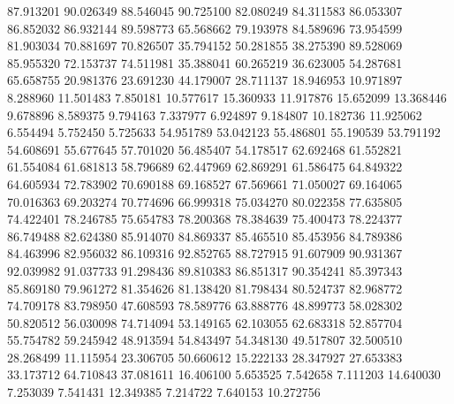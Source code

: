 87.913201
90.026349
88.546045
90.725100
82.080249
84.311583
86.053307
86.852032
86.932144
89.598773
65.568662
79.193978
84.589696
73.954599
81.903034
70.881697
70.826507
35.794152
50.281855
38.275390
89.528069
85.955320
72.153737
74.511981
35.388041
60.265219
36.623005
54.287681
65.658755
20.981376
23.691230
44.179007
28.711137
18.946953
10.971897
8.288960
11.501483
7.850181
10.577617
15.360933
11.917876
15.652099
13.368446
9.678896
8.589375
9.794163
7.337977
6.924897
9.184807
10.182736
11.925062
6.554494
5.752450
5.725633
54.951789
53.042123
55.486801
55.190539
53.791192
54.608691
55.677645
57.701020
56.485407
54.178517
62.692468
61.552821
61.554084
61.681813
58.796689
62.447969
62.869291
61.586475
64.849322
64.605934
72.783902
70.690188
69.168527
67.569661
71.050027
69.164065
70.016363
69.203274
70.774696
66.999318
75.034270
80.022358
77.635805
74.422401
78.246785
75.654783
78.200368
78.384639
75.400473
78.224377
86.749488
82.624380
85.914070
84.869337
85.465510
85.453956
84.789386
84.463996
82.956032
86.109316
92.852765
88.727915
91.607909
90.931367
92.039982
91.037733
91.298436
89.810383
86.851317
90.354241
85.397343
85.869180
79.961272
81.354626
81.138420
81.798434
80.524737
82.968772
74.709178
83.798950
47.608593
78.589776
63.888776
48.899773
58.028302
50.820512
56.030098
74.714094
53.149165
62.103055
62.683318
52.857704
55.754782
59.245942
48.913594
54.843497
54.348130
49.517807
32.500510
28.268499
11.115954
23.306705
50.660612
15.222133
28.347927
27.653383
33.173712
64.710843
37.081611
16.406100
5.653525
7.542658
7.111203
14.640030
7.253039
7.541431
12.349385
7.214722
7.640153
10.272756
